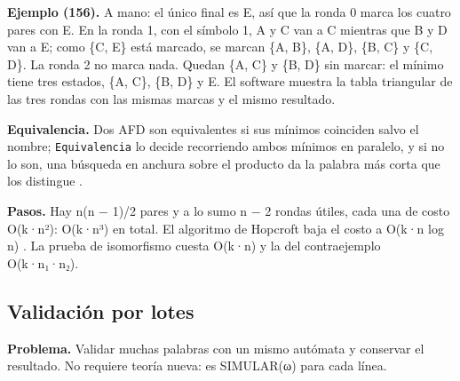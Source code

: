 \begin{Shaded}
\begin{Highlighting}[]
\end{Highlighting}
\end{Shaded}

\textbf{Ejemplo (156).} A mano: el único final es E, así que la ronda 0 marca los cuatro pares con E. En la ronda 1, con el símbolo 1, A y C van a C mientras que B y D van a E; como \{C, E\} está marcado, se marcan \{A, B\}, \{A, D\}, \{B, C\} y \{C, D\}. La ronda 2 no marca nada. Quedan \{A, C\} y \{B, D\} sin marcar: el mínimo tiene tres estados, \{A, C\}, \{B, D\} y E. El software muestra la tabla triangular de las tres rondas con las mismas marcas y el mismo resultado.

\textbf{Equivalencia.} Dos AFD son equivalentes si sus mínimos coinciden salvo el nombre; \texttt{Equivalencia} lo decide recorriendo ambos mínimos en paralelo, y si no lo son, una búsqueda en anchura sobre el producto da la palabra más corta que los distingue \autocite[sec.~4.4.2]{hopcroft2007}.

\textbf{Pasos.} Hay n(n − 1)/2 pares y a lo sumo n − 2 rondas útiles, cada una de costo O(k·n²): O(k·n³) en total. El algoritmo de Hopcroft baja el costo a O(k·n log n) \autocite{hopcroft1971}. La prueba de isomorfismo cuesta O(k·n) y la del contraejemplo O(k·n₁·n₂).

\hypertarget{validaciuxf3n-por-lotes}{%
\subsection{Validación por lotes}\label{validaciuxf3n-por-lotes}}

\textbf{Problema.} Validar muchas palabras con un mismo autómata y conservar el resultado. No requiere teoría nueva: es SIMULAR(ω) para cada línea.

